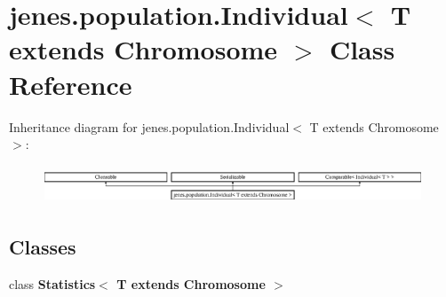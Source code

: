 \hypertarget{classjenes_1_1population_1_1_individual_3_01_t_01extends_01_chromosome_01_4}{\section{jenes.\-population.\-Individual$<$ T extends Chromosome $>$ Class Reference}
\label{classjenes_1_1population_1_1_individual_3_01_t_01extends_01_chromosome_01_4}
}
Inheritance diagram for jenes.\-population.\-Individual$<$ T extends Chromosome $>$\-:\begin{figure}[H]
\begin{center}
\leavevmode
\includegraphics[height=1.141692cm]{classjenes_1_1population_1_1_individual_3_01_t_01extends_01_chromosome_01_4}
\end{center}
\end{figure}
\subsection*{Classes}
\begin{DoxyCompactItemize}
\item 
class {\bfseries Statistics$<$ T extends Chromosome $>$}
\end{DoxyCompactItemize}
